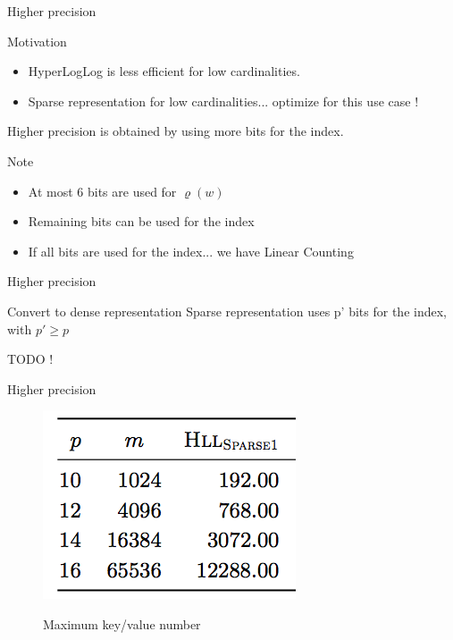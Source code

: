 \documentclass{beamer}
\begin{document}


\begin{frame}{Higher precision}


\begin{block}{Motivation}
\begin{itemize}
\item HyperLogLog is less efficient for low cardinalities. 
\item Sparse representation for low cardinalities... optimize for this use case !
\end{itemize}
\end{block}

Higher precision is obtained by using more bits for the index. 

\begin{block}{Note}
\begin{itemize} 
\item At most 6 bits are used for $\varrho(w)$
\item Remaining bits can be used for the index
\item If all bits are used for the index... we have Linear Counting
\end{itemize}
\end{block}

\end{frame}



\begin{frame}{Higher precision}


\begin{block}{Convert to dense representation}
Sparse representation uses p' bits for the index, with $p' \ge p$

TODO !
\end{block}

\end{frame}

\begin{frame}{Higher precision}


\begin{figure}[c]
\includegraphics [scale=0.45]  {sparse1.png}

Maximum key/value number
\end{figure}

\end{frame}
\end{document}
